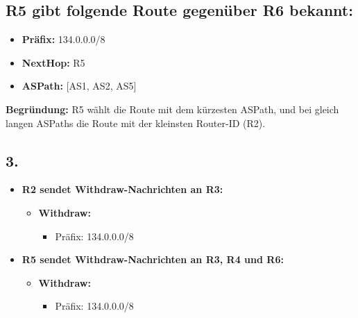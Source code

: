 \documentclass[a4paper]{scrartcl}
\begin{document}
\subsection*{R5 gibt folgende Route gegenüber R6 bekannt:}

\begin{itemize}
    \item \textbf{Präfix:} 134.0.0.0/8
    \item \textbf{NextHop:} R5
    \item \textbf{ASPath:} [AS1, AS2, AS5]
\end{itemize}

\textbf{Begründung:} R5 wählt die Route mit dem kürzesten ASPath, und bei gleich langen ASPaths die Route mit der kleinsten Router-ID (R2).

\subsection*{3.}
\begin{itemize}
  \item \textbf{R2 sendet Withdraw-Nachrichten an R3:}
  \begin{itemize}
      \item \textbf{Withdraw:}
      \begin{itemize}
          \item Präfix: 134.0.0.0/8
      \end{itemize}
  \end{itemize}
  \item \textbf{R5 sendet Withdraw-Nachrichten an R3, R4 und R6:}
  \begin{itemize}
      \item \textbf{Withdraw:}
      \begin{itemize}
          \item Präfix: 134.0.0.0/8
      \end{itemize}
  \end{itemize}
\end{itemize}
\end{document}
